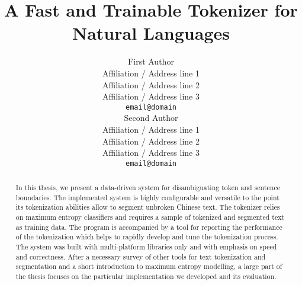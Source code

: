 \documentclass[11pt]{article}
\title{A Fast and Trainable Tokenizer for Natural Languages}
\author{First Author \\
  Affiliation / Address line 1 \\
  Affiliation / Address line 2 \\
  Affiliation / Address line 3 \\
  {\tt email@domain} \\\And
  Second Author \\
  Affiliation / Address line 1 \\
  Affiliation / Address line 2 \\
  Affiliation / Address line 3 \\
  {\tt email@domain} \\}
\date{}
\begin{document}
\maketitle
\begin{abstract}
In this thesis, we present a data-driven system for disambiguating
token and sentence boundaries. The implemented system is highly
configurable and versatile to the point its tokenization abilities
allow to segment unbroken Chinese text. The tokenizer relies on
maximum entropy classifiers and requires a sample of tokenized and
segmented text as training data. The program is accompanied by a tool
for reporting the performance of the tokenization which helps to
rapidly develop and tune the tokenization process. The system was
built with multi-platform libraries only and with emphasis on speed
and correctness. After a necessary survey of other tools for text
tokenization and segmentation and a short introduction to maximum
entropy modelling, a large part of the thesis focuses on the
particular implementation we developed and its evaluation.
\end{abstract}









\end{document}
